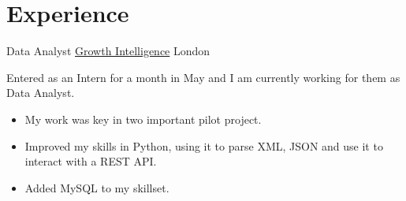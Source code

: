 \documentclass[11pt,a4paper,roman]{moderncv}
\begin{document}







\section{Experience}

	{Data Analyst}
	{\href{http://growthintel.com/}{Growth Intelligence}}
	{London}
	{}
	{Entered as an Intern for a month in May and I am currently working for them as Data
	 Analyst.
	\begin{itemize}
		\item My work was key in two important pilot project.
		\item Improved my skills in Python, using it to parse XML, JSON and use it to 
		interact with a REST API.
		\item Added MySQL to my skillset.
	\end{itemize}}
\end{document}
